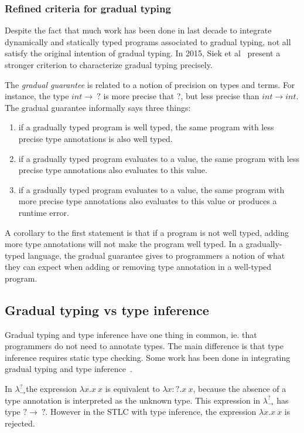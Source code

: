 \documentclass{article}
\newcommand\gstlc[0]{$\lambda^?_{\rightarrow}$}
\begin{document}
\subsubsection{Refined criteria for gradual typing}
Despite the fact that much work has been done in last decade to integrate dynamically and statically typed programs associated to gradual typing, not all satisfy the original intention of gradual typing. In 2015, Siek et al~\cite{siekAl:snapl2015} present a stronger criterion to characterize gradual typing precisely. 

The \emph{gradual guarantee} is related to a notion of precision on types and terms. For instance, the type $int \rightarrow \:?$ is more precise that ?, but less precise than $int \rightarrow int$. The gradual guarantee informally says three things:
\begin{enumerate}
	\item if a gradually typed program is well typed,  the same program with less precise type annotations is also well typed.
\item if a gradually typed program evaluates to a value, the same program with less precise type annotations also evaluates to this value.
\item if a gradually typed program evaluates to a value, the same program with more precise type annotations also evaluates to this value or produces a runtime error.
\end{enumerate}

A corollary to the first statement is that if a program is not well typed, adding more type annotations will not make the program well typed. In a gradually-typed language, the gradual guarantee gives to programmers a notion of what they can expect when adding or removing type annotation in a well-typed program.

\subsection{Gradual typing vs type inference}
Gradual typing and type inference have one thing in common, ie. that programmers do not need to annotate types. The main difference is that type inference requires static type checking. Some work has been done in integrating gradual typing and type inference~\cite{siekVachharajani:dls2008, garciaCimini:popl2015, rastogi:popl2012}.

In \gstlc \:the expression $\lambda x. x \: x$ is equivalent to $\lambda x:?. x \: x$, because the absence of a type annotation is interpreted as the unknown type. This expression in \gstlc \: has type $? \rightarrow \: ?$. However in the STLC with type inference, the expression $\lambda x. x \: x$ is rejected.
\end{document}
